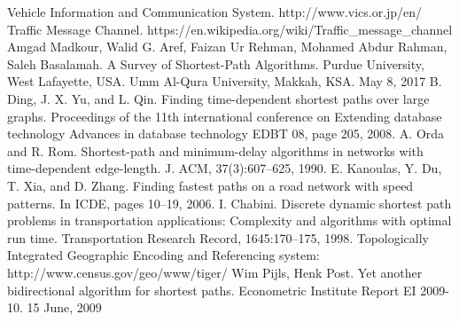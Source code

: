 \documentclass[12pt]{article}
\begin{document}
\pagebreak
\begin{thebibliography}{}
     Vehicle Information and Communication System. http://www.vics.or.jp/en/
     Traffic Message Channel. https://en.wikipedia.org/wiki/Traffic\_message\_channel
     Amgad Madkour, Walid G. Aref, Faizan Ur Rehman, Mohamed Abdur Rahman, Saleh
Basalamah. A Survey of Shortest-Path Algorithms. Purdue University, West Lafayette, USA.
Umm Al-Qura University, Makkah, KSA. May 8, 2017
     B. Ding, J. X. Yu, and L. Qin. Finding time-dependent shortest paths over large graphs.
Proceedings of the 11th international conference on Extending database technology Advances
in database technology EDBT 08, page 205, 2008.
     A. Orda and R. Rom. Shortest-path and minimum-delay algorithms in networks with time-dependent edge-length. J. ACM, 37(3):607–625, 1990.
     E. Kanoulas, Y. Du, T. Xia, and D. Zhang. Finding fastest paths on a road network with speed patterns. In ICDE, pages
10–19, 2006.
      I. Chabini. Discrete dynamic shortest path problems in transportation applications: Complexity and algorithms with optimal run time. Transportation Research Record,
1645:170–175, 1998.
     Topologically Integrated Geographic Encoding and Referencing system: http://www.census.gov/geo/www/tiger/
     Wim Pijls, Henk Post. Yet another bidirectional algorithm for shortest paths. Econometric Institute Report EI 2009-10. 15 June, 2009
\end{thebibliography} 
\end{document}
